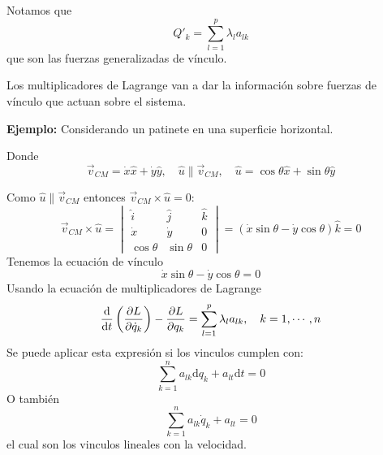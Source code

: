 \documentclass[../main]{subfiles}
\begin{document}
Notamos que
\begin{equation}
    Q'_k = \sum_{l=1}^p \lambda_l a_{lk}
\end{equation}
que son las fuerzas generalizadas de vínculo.

Los multiplicadores de Lagrange van a dar la información sobre fuerzas de vínculo que actuan sobre el sistema.

\textbf{Ejemplo:} Considerando un patinete en una superficie horizontal.

Donde
\begin{equation*}
    \vec{v}_{CM}=\dot{x}\hat{x}+\dot{y}\hat{y}, \quad \hat{u}\parallel \vec{v}_{CM},\quad \hat{u}=\cos \theta \hat{x}+\sin \theta \hat{y}
\end{equation*}

Como $\hat{u}\parallel \vec{v}_{CM}$ entonces $\vec{v}_{CM}\times \hat{u}=0$:
\begin{equation*}
    \vec{v}_{CM}\times \hat{u} = 
    \begin{vmatrix}
        \hat{i} & \hat{j} & \hat{k} \\
        \dot{x} & \dot{y} & 0 \\
        \cos \theta & \sin \theta & 0
    \end{vmatrix}
    =(\dot{x}\sin \theta-\dot{y}\cos \theta)\hat{k}=0
\end{equation*}
Tenemos la ecuación de vínculo
\begin{equation*}
    \dot{x}\sin \theta-\dot{y}\cos \theta=0
\end{equation*}
Usando la ecuación de multiplicadores de Lagrange
\begin{equation*}
    \dv{}{t}\left(\pdv{L}{\dot{q}_k}\right)-\pdv{L}{q_k}=\sum_{l=1}^p \lambda_l a_{lk}, \quad k=1,\cdots, n
\end{equation*}
Se puede aplicar esta expresión si los vinculos cumplen con:
\begin{equation*}
    \sum_{k=1}^n a_{lk} \mathrm{d}q_k+a_{lt}\mathrm{d}t=0
\end{equation*}
O también
\begin{equation*}
    \sum_{k=1}^n a_{lk}\dot{q}_k+a_{lt}=0
\end{equation*}
el cual son los vinculos lineales con la velocidad.
\end{document}
